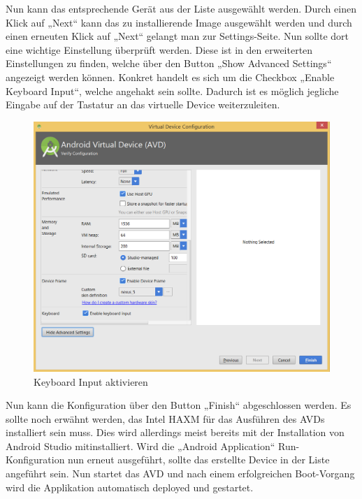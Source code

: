 Nun kann das entsprechende Gerät aus der Liste ausgewählt werden. Durch einen Klick auf „Next“ kann das zu installierende Image ausgewählt werden und durch einen erneuten Klick auf „Next“ gelangt man zur Settings-Seite. Nun sollte dort eine wichtige Einstellung überprüft werden. Diese ist in den erweiterten Einstellungen zu finden, welche über den Button „Show Advanced Settings“ angezeigt werden können. Konkret handelt es sich um die Checkbox „Enable Keyboard Input“, welche angehakt sein sollte. Dadurch ist es möglich jegliche Eingabe auf der Tastatur an das virtuelle Device weiterzuleiten.

\begin{figure}[H]
	\begin{center}
		\includegraphics[width=1.0\linewidth]{images/key_input.png}
		\caption{Keyboard Input aktivieren}
		\label{Keyboard Input aktivieren}
	\end{center}
\end{figure}

Nun kann die Konfiguration über den Button „Finish“ abgeschlossen werden. Es sollte noch erwähnt werden, das Intel HAXM für das Ausführen des AVDs installiert sein muss. Dies wird allerdings meist bereits mit der Installation von Android Studio mitinstalliert.
Wird die „Android Application“ Run-Konfiguration nun erneut ausgeführt, sollte das erstellte Device in der Liste angeführt sein. Nun startet das AVD und nach einem erfolgreichen Boot-Vorgang wird die Applikation automatisch deployed und gestartet.

